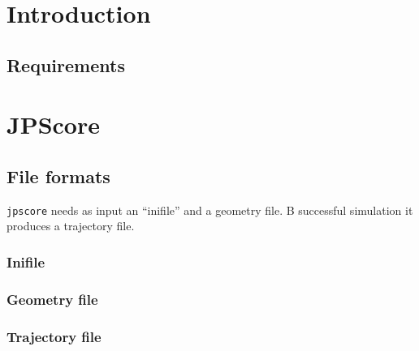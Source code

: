 \documentclass[%
paper=A4,					%
twoside=true,				%
openright,					%
parskip=full,				%
chapterprefix=true,			%
11pt,						%
headings=normal,			%
bibliography=totoc,			%
listof=totoc,				%
titlepage=on,				%
captions=tableabove,		%
draft=false,				%
]{scrreprt}%
\begin{document}
\chapter{Introduction}

% 


% 
 \newpage
\section{Requirements}

\newpage
% 
 \chapter{JPScore}
\section{File formats}
\texttt{jpscore} needs as input an ``inifile'' and a geometry file. B successful simulation it produces a trajectory file.

\subsection{Inifile}

\newpage
\subsection{Geometry file}

\newpage
\subsection{Trajectory file}

\end{document}

